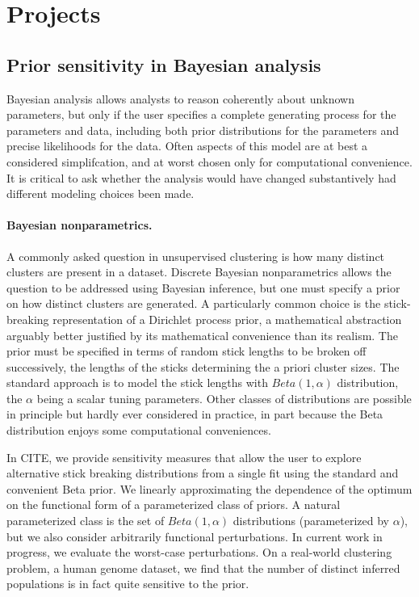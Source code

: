 \section{Projects}

\subsection{Prior sensitivity in Bayesian analysis}

Bayesian analysis allows analysts to reason coherently about unknown parameters,
but only if the user specifies a complete generating process for the parameters
and data, including both prior distributions for the parameters and precise
likelihoods for the data.  Often aspects of this model are at best a considered
simplifcation, and at worst chosen only for computational convenience.  It is
critical to ask whether the analysis would have changed substantively had
different modeling choices been made.

\paragraph{Bayesian nonparametrics.}

A commonly asked question in unsupervised clustering is how many distinct
clusters are present in a dataset.  Discrete Bayesian nonparametrics allows the
question to be addressed using Bayesian inference, but one must specify a prior
on how distinct clusters are generated.  A particularly common choice is
the stick-breaking representation of a Dirichlet process prior, a mathematical
abstraction arguably better justified by its mathematical convenience than
its realism.  The prior must be specified in terms of random stick lengths
to be broken off successively, the lengths of the sticks determining
the a priori cluster sizes.  The standard approach is to model the stick
lengths with $Beta(1, \alpha)$ distribution, the $\alpha$ being a scalar
tuning parameters.  Other classes of distributions are possible in principle
but hardly ever considered in practice, in part because the Beta distribution
enjoys some computational conveniences.

In CITE, we provide sensitivity measures that allow the user to explore
alternative stick breaking distributions from a single fit using the standard
and convenient Beta prior.  We linearly approximating the dependence of the
optimum on the functional form of a parameterized class of priors.  A natural
parameterized class is the set of $Beta(1, \alpha)$ distributions (parameterized
by $\alpha$), but we also consider arbitrarily functional perturbations.
In current work in progress, we evaluate the worst-case perturbations.
On a real-world clustering problem, a human genome dataset, we find that
the number of distinct inferred populations is in fact quite sensitive
to the prior.


